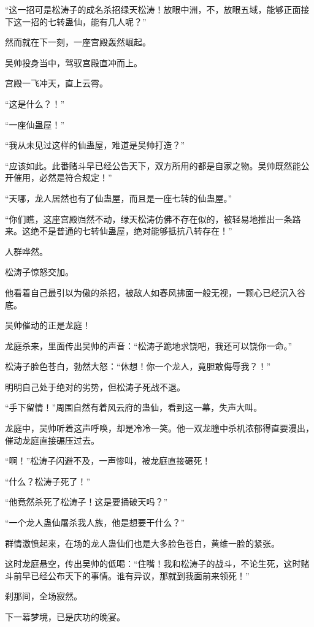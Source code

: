 \begin{this_body}
“这一招可是松涛子的成名杀招绿天松涛！放眼中洲，不，放眼五域，能够正面接下这一招的七转蛊仙，能有几人呢？”

然而就在下一刻，一座宫殿轰然崛起。

吴帅投身当中，驾驭宫殿直冲而上。

宫殿一飞冲天，直上云霄。

“这是什么？！”

“一座仙蛊屋！”

“我从未见过这样的仙蛊屋，难道是吴帅打造？”

“应该如此。此番赌斗早已经公告天下，双方所用的都是自家之物。吴帅既然能公开催用，必然是符合规定！”

“天哪，龙人居然也有了仙蛊屋，而且是一座七转的仙蛊屋。”

“你们瞧，这座宫殿岿然不动，绿天松涛仿佛不存在似的，被轻易地推出一条路来。这绝不是普通的七转仙蛊屋，绝对能够抵抗八转存在！”

人群哗然。

松涛子惊怒交加。

他看着自己最引以为傲的杀招，被敌人如春风拂面一般无视，一颗心已经沉入谷底。

吴帅催动的正是龙庭！

龙庭杀来，里面传出吴帅的声音：“松涛子跪地求饶吧，我还可以饶你一命。”

松涛子脸色苍白，勃然大怒：“休想！你一个龙人，竟胆敢侮辱我？！”

明明自己处于绝对的劣势，但松涛子死战不退。

“手下留情！”周围自然有着风云府的蛊仙，看到这一幕，失声大叫。

龙庭中，吴帅听着这声呼唤，却是冷冷一笑。他一双龙瞳中杀机浓郁得直要漫出，催动龙庭直接碾压过去。

“啊！”松涛子闪避不及，一声惨叫，被龙庭直接碾死！

“什么？松涛子死了！”

“他竟然杀死了松涛子！这是要捅破天吗？”

“一个龙人蛊仙屠杀我人族，他是想要干什么？”

群情激愤起来，在场的龙人蛊仙们也是大多脸色苍白，黄维一脸的紧张。

这时龙庭悬空，传出吴帅的低喝：“住嘴！我和松涛子的战斗，不论生死，这时赌斗前早已经公布天下的事情。谁有异议，那就到我面前来领死！”

刹那间，全场寂然。

下一幕梦境，已是庆功的晚宴。


\end{this_body}
